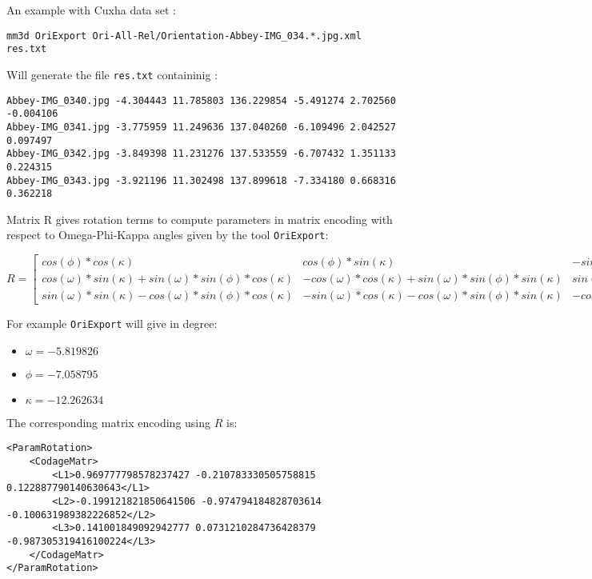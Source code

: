 An example with Cuxha data set :

\begin{verbatim}
mm3d OriExport Ori-All-Rel/Orientation-Abbey-IMG_034.*.jpg.xml  res.txt
\end{verbatim}

Will generate the file {\tt res.txt}  containinig :

\begin{verbatim}
Abbey-IMG_0340.jpg -4.304443 11.785803 136.229854 -5.491274 2.702560 -0.004106
Abbey-IMG_0341.jpg -3.775959 11.249636 137.040260 -6.109496 2.042527 0.097497
Abbey-IMG_0342.jpg -3.849398 11.231276 137.533559 -6.707432 1.351133 0.224315
Abbey-IMG_0343.jpg -3.921196 11.302498 137.899618 -7.334180 0.668316 0.362218
\end{verbatim}

Matrix R gives rotation terms to compute parameters in matrix encoding with respect to Omega-Phi-Kappa angles given by the tool {\tt OriExport}:
\newline


$R =
\begin{bmatrix}
    cos(\phi)*cos(\kappa) &  cos(\phi)*sin(\kappa) & -sin(\phi)\\
    cos(\omega)*sin(\kappa)+sin(\omega)*sin(\phi)*cos(\kappa) &  -cos(\omega)*cos(\kappa)+sin(\omega)*sin(\phi)*sin(\kappa) & sin(\omega)*cos(\phi)\\
    sin(\omega)*sin(\kappa)-cos(\omega)*sin(\phi)*cos(\kappa)  & -sin(\omega)*cos(\kappa)-cos(\omega)*sin(\phi)*sin(\kappa) & -cos(\omega)*cos(\phi)
\end{bmatrix}$
\newline


For example {\tt OriExport} will give in degree:
\newline


\begin{itemize}
\item $\omega=-5.819826$  
\item $\phi=-7.058795$  
\item $\kappa=-12.262634$\newline
\end{itemize}



The corresponding matrix encoding using $R$ is:


\begin{verbatim}
<ParamRotation>
    <CodageMatr>
        <L1>0.969777798578237427 -0.210783330505758815 0.122887790140630643</L1>
        <L2>-0.199121821850641506 -0.974794184828703614 -0.100631989382226852</L2>
        <L3>0.141001849092942777 0.0731210284736428379 -0.987305319416100224</L3>
	</CodageMatr>
</ParamRotation>
\end{verbatim}

